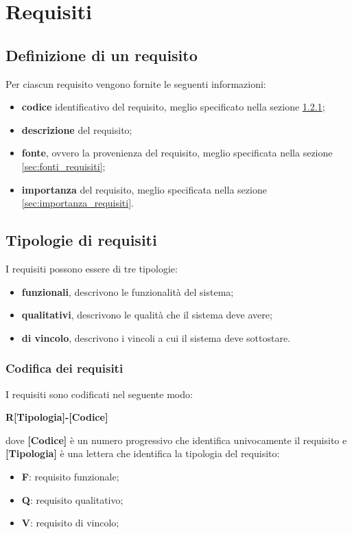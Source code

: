 \section{Requisiti}
\subsection{Definizione di un requisito}
Per ciascun requisito vengono fornite le seguenti informazioni:
\begin{itemize}
	\item \textbf{codice} identificativo del requisito, meglio specificato nella sezione \ref{sec:codifica_requisiti};
	\item \textbf{descrizione} del requisito;
	\item \textbf{fonte}, ovvero la provenienza del requisito, meglio specificata nella sezione \ref{sec:fonti_requisiti};
	\item \textbf{importanza} del requisito, meglio specificata nella sezione \ref{sec:importanza_requisiti}.
\end{itemize}

\subsection{Tipologie di requisiti}
I requisiti possono essere di tre tipologie:
\begin{itemize}
	\item \textbf{funzionali}, descrivono le funzionalità del sistema;
	\item \textbf{qualitativi}, descrivono le qualità che il sistema deve avere;
	\item \textbf{di vincolo}, descrivono i vincoli a cui il sistema deve sottostare.
\end{itemize}

\subsubsection{Codifica dei requisiti}
\label{sec:codifica_requisiti}
I requisiti sono codificati nel seguente modo:
\begin{center}
	\textbf{R[Tipologia]-[Codice]}
\end{center}
dove \textbf{[Codice]} è un numero progressivo che identifica univocamente il requisito
e \textbf{[Tipologia]} è una lettera che identifica la tipologia del requisito:
\begin{itemize}
	\item \textbf{F}: requisito funzionale;
	\item \textbf{Q}: requisito qualitativo;
	\item \textbf{V}: requisito di vincolo;
\end{itemize}

